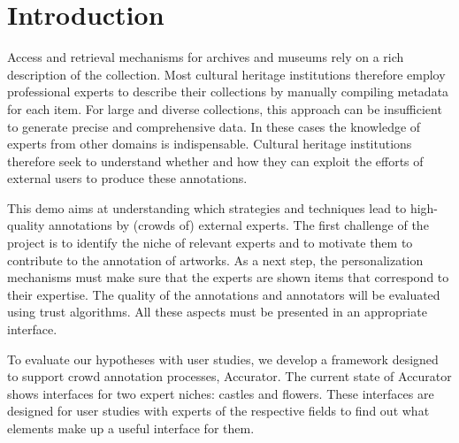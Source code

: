 \section{Introduction}\label{introduction}
Access and retrieval mechanisms for archives and museums rely on a rich description of the collection. Most cultural heritage institutions therefore employ professional experts to describe their collections by manually compiling metadata for each item. For large and diverse collections, this approach can be insufficient to generate precise and comprehensive data. In these cases the knowledge of experts from other domains is indispensable.  Cultural heritage institutions therefore seek to understand whether and how they can exploit the efforts of external users to produce these annotations.

This demo aims at understanding which strategies and techniques lead to high-quality annotations by (crowds of) external experts. The first challenge of the project is to identify the niche of relevant experts and to motivate them to contribute to the annotation of artworks. As a next step, the personalization mechanisms must make sure that the experts are shown items that correspond to their expertise. The quality of the annotations and annotators will be evaluated using trust algorithms. All these aspects must be presented in an appropriate interface.

To evaluate our hypotheses with user studies, we develop a framework designed to support crowd annotation processes, Accurator. The current state of Accurator shows interfaces for two expert niches: castles and flowers. These interfaces are designed for user studies with experts of the respective fields to find out what elements make up a useful interface for them.